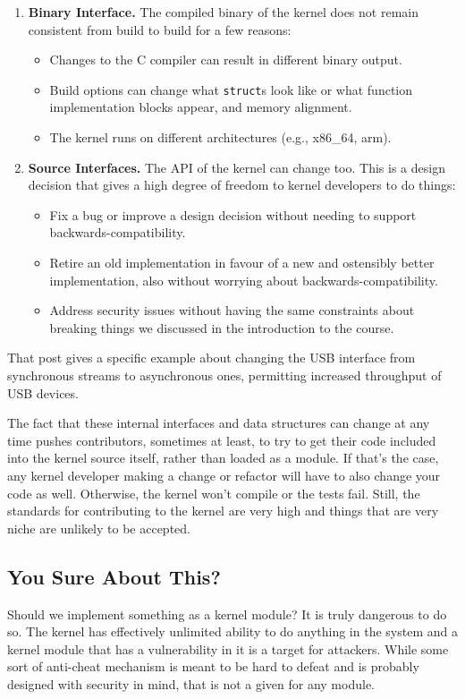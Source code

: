 \begin{enumerate}
	\item \textbf{Binary Interface.} The compiled binary of the kernel does not remain consistent from build to build for a few reasons:
		\begin{itemize}
			\item Changes to the C compiler can result in different binary output.
			\item Build options can change what \texttt{struct}s look like or what function implementation blocks appear, and memory alignment.
			\item The kernel runs on different architectures (e.g., x86\_64, arm).
		\end{itemize}
	\item \textbf{Source Interfaces.} The API of the kernel can change too. This is a design decision that gives a high degree of freedom to kernel developers to do things:
		\begin{itemize}
			\item Fix a bug or improve a design decision without needing to support backwards-compatibility.
			\item Retire an old implementation in favour of a new and ostensibly better implementation, also without worrying about backwards-compatibility.
			\item Address security issues without having the same constraints about breaking things we discussed in the introduction to the course.
		\end{itemize}
\end{enumerate}

That post gives a specific example about changing the USB interface from synchronous streams to asynchronous ones, permitting increased throughput of USB devices. 

The fact that these internal interfaces and data structures can change at any time pushes contributors, sometimes at least, to try to get their code included into the kernel source itself, rather than loaded as a module. If that's the case, any kernel developer making a change or refactor will have to also change your code as well. Otherwise, the kernel won't compile or the tests fail. Still, the standards for contributing to the kernel are very high and things that are very niche are unlikely to be accepted.

\subsection*{You Sure About This?}
Should we implement something as a kernel module? It is truly dangerous to do so. The kernel has effectively unlimited ability to do anything in the system and a kernel module that has a vulnerability in it is a target for attackers. While some sort of anti-cheat mechanism is meant to be hard to defeat and is probably designed with security in mind, that is not a given for any module.

